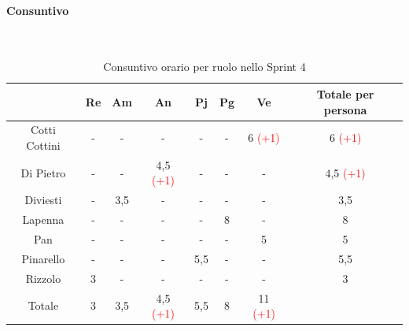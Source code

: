 \documentclass{article}
\begin{document}
                \paragraph{Consuntivo}\mbox{}\\
                \begin{table}[H]
                    \centering
                    \begin{tabular}{|c|c|c|c|c|c|c|c|}
                    \hline
                                & Re  & Am  & An  & Pj  & Pg  & Ve  & Totale per persona \\ \hline
                    Cotti Cottini & -   & -   & -   & -   & -   & 6 \textcolor{red}{(+1)}  & 6 \textcolor{red}{(+1)}                 \\ \hline
                    Di Pietro     & -   & -   & 4,5 \textcolor{red}{(+1)} & -   & -   & -   & 4,5 \textcolor{red}{(+1)}               \\ \hline
                    Diviesti      & -   & 3,5 & -   & -   & -   & -   & 3,5                \\ \hline
                    Lapenna       & -   & -   & -   & -   & 8  & -   & 8                 \\ \hline
                    Pan           & -   & -   & -   & -   & -   & 5   & 5                  \\ \hline
                    Pinarello     & -   & -   & -   & 5,5 & -   & -   & 5,5                \\ \hline
                    Rizzolo       & 3   & -   & -   & -   & -   & -   & 3                  \\ \hline
                    Totale        & 3   & 3,5 & 4,5 \textcolor{red}{(+1)} & 5,5 & 8  & 11 \textcolor{red}{(+1)}  &                    \\ \hline
                    \end{tabular}
                    \caption{Consuntivo orario per ruolo nello Sprint 4}
                \end{table}

\end{document}
